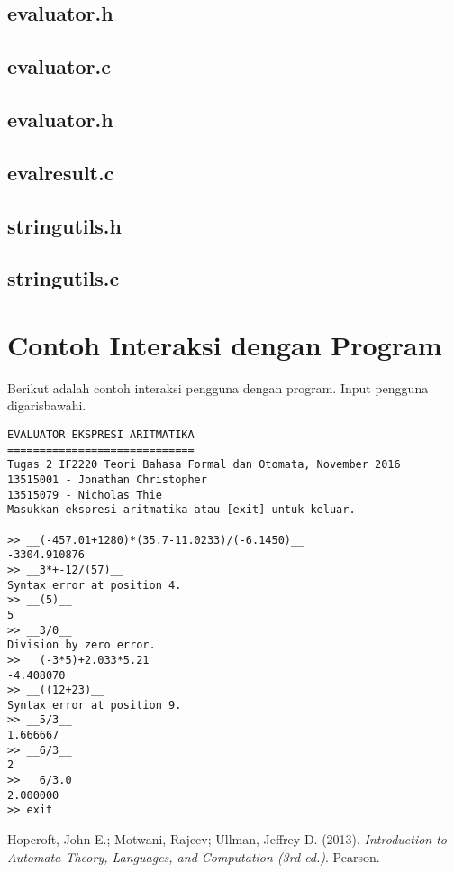 \documentclass[a4paper,titlepage]{article}
\begin{document}
		\subsection{evaluator.h}
			

		\subsection{evaluator.c}
			

		\subsection{evaluator.h}
			

		\subsection{evalresult.c}
			

		\subsection{stringutils.h}
			

		\subsection{stringutils.c}
			

	\section{Contoh Interaksi dengan Program}

		Berikut adalah contoh interaksi pengguna dengan program. Input pengguna digarisbawahi.

		\begin{lstlisting}
EVALUATOR EKSPRESI ARITMATIKA
=============================
Tugas 2 IF2220 Teori Bahasa Formal dan Otomata, November 2016
13515001 - Jonathan Christopher
13515079 - Nicholas Thie
Masukkan ekspresi aritmatika atau [exit] untuk keluar.

>> __(-457.01+1280)*(35.7-11.0233)/(-6.1450)__
-3304.910876
>> __3*+-12/(57)__
Syntax error at position 4.
>> __(5)__
5
>> __3/0__
Division by zero error.
>> __(-3*5)+2.033*5.21__
-4.408070
>> __((12+23)__
Syntax error at position 9.
>> __5/3__
1.666667
>> __6/3__
2
>> __6/3.0__
2.000000
>> exit
	\end{lstlisting}

	\begin{thebibliography}{9}

		Hopcroft, John E.; Motwani, Rajeev; Ullman, Jeffrey D.
		(2013).
		\textit{Introduction to Automata Theory, Languages, and Computation (3rd ed.)}.
		Pearson.

	\end{thebibliography}
\end{document}
